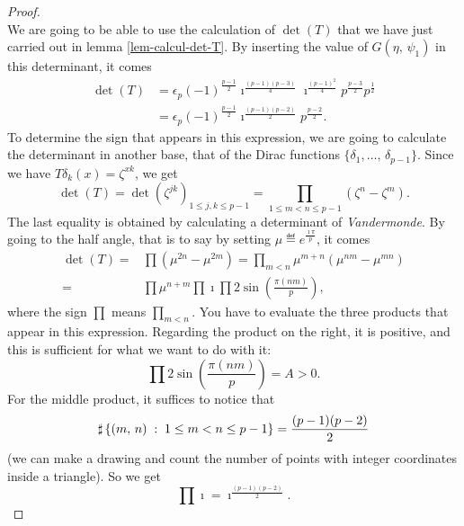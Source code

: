 \begin{proof}
\begin{equation*}
\end{equation*}
We are going to be able to use the calculation of $ \det (T) $ that we have just carried out in lemma \ref{lem-calcul-det-T}. By inserting the value of $ G (\eta, \, \psi_1) $ in this determinant, it comes
\begin{align}
\det (T) & = \epsilon_p (-1)^{\frac{p-1}{2}} \imath^{\frac{(p-1) (p-3)}{4}} \imath^{\frac{(p-1)^2}{4}} p^{\frac{p-3}{2}} p^{\frac{1}{2}} \\
\label{eq-expr-det-T-unknown-sign}
& = \epsilon_p (-1)^{\frac{p-1}{2}} \imath^{\frac{(p-1) (p-2)}{2}} p^{\frac{p -2}{2}}.
\end{align}
To determine the sign that appears in this expression, we are going to calculate the determinant in another base, that of the Dirac functions $ \{\delta_1, \ldots, \, \delta_{p-1}\} $. Since we have $ T \delta_k (x) = \zeta^{xk} $, we get
\begin{equation*}
\det (T) = \det \left(\zeta^{jk} \right)_{1 \leq j, k \leq p-1} = \prod_{1 \leq m <n \leq p-1} \left(\zeta^n - \zeta^m \right).
\end{equation*}
 The last equality is obtained by calculating a determinant of \textit{Vandermonde}. By going to the half angle, that is to say by setting $ \mu \eqdef e^{\frac{\imath \pi}{p}} $, it comes
\begin{align*}
\det (T) = & \prod{(\mu^{2n} - \mu^{2m})} = \prod_{m <n}{\mu^{m + n} (\mu^{nm} - \mu^{mn})} \\
= & \prod{\mu^{n + m}} \prod{\imath} \prod{2 \sin \left(\frac{\pi (nm)}{p} \right)},
\end{align*}
where the sign $ \prod $ means $ \prod_{m <n} $. You have to evaluate the three products that appear in this expression. Regarding the product on the right, it is positive, and this is sufficient for what we want to do with it:
\begin{equation*}
\prod{2 \sin \left(\frac{\pi (nm)}{p} \right)} = A> 0.
\end{equation*}
For the middle product, it suffices to notice that
\begin{equation*}
\sharp \left\{ (m, \, n) \;:\; 1 \leq m <n \leq p-1 \right\} = \frac{(p-1) (p-2)}{2}
\end{equation*}
(we can make a drawing and count the number of points with integer coordinates inside a triangle). So we get
\begin{equation*}
\prod{\imath} = \imath^{\frac{(p-1) (p-2)}{2}}.
\end{equation*}

\end{proof}
